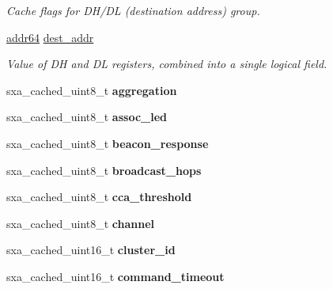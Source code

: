 \begin{DoxyCompactItemize}
\begin{DoxyCompactList}\small\item\em Cache flags for D\-H/\-D\-L (destination address) group. \end{DoxyCompactList}\item 
\hyperlink{unionaddr64}{addr64} \hyperlink{structsxa__node__t_abb357ccdd72453fd6f4ee76e18fde30c}{dest\-\_\-addr}
\begin{DoxyCompactList}\small\item\em Value of D\-H and D\-L registers, combined into a single logical field. \end{DoxyCompactList}\item 
\hypertarget{structsxa__node__t_addae4971fe88bef06542be6b2de54ea3}{sxa\-\_\-cached\-\_\-uint8\-\_\-t {\bfseries aggregation}}\label{structsxa__node__t_addae4971fe88bef06542be6b2de54ea3}

\item 
\hypertarget{structsxa__node__t_a4857814d272d7c236f20217036eadaa7}{sxa\-\_\-cached\-\_\-uint8\-\_\-t {\bfseries assoc\-\_\-led}}\label{structsxa__node__t_a4857814d272d7c236f20217036eadaa7}

\item 
\hypertarget{structsxa__node__t_afbbaf03169e6357fcc78463452c5f473}{sxa\-\_\-cached\-\_\-uint8\-\_\-t {\bfseries beacon\-\_\-response}}\label{structsxa__node__t_afbbaf03169e6357fcc78463452c5f473}

\item 
\hypertarget{structsxa__node__t_a2fe0610672454f943a5a01ade84e7180}{sxa\-\_\-cached\-\_\-uint8\-\_\-t {\bfseries broadcast\-\_\-hops}}\label{structsxa__node__t_a2fe0610672454f943a5a01ade84e7180}

\item 
\hypertarget{structsxa__node__t_a9b601d4ed7a3ec9b0e05528390e78cdd}{sxa\-\_\-cached\-\_\-uint8\-\_\-t {\bfseries cca\-\_\-threshold}}\label{structsxa__node__t_a9b601d4ed7a3ec9b0e05528390e78cdd}

\item 
\hypertarget{structsxa__node__t_a1f6b05bef57db1f1cbb4740a78914b5f}{sxa\-\_\-cached\-\_\-uint8\-\_\-t {\bfseries channel}}\label{structsxa__node__t_a1f6b05bef57db1f1cbb4740a78914b5f}

\item 
\hypertarget{structsxa__node__t_a112bc7028dd0dd7833eff63333fae9bb}{sxa\-\_\-cached\-\_\-uint16\-\_\-t {\bfseries cluster\-\_\-id}}\label{structsxa__node__t_a112bc7028dd0dd7833eff63333fae9bb}

\item 
\hypertarget{structsxa__node__t_a46cab60ad63ab8babe24c5ce86516638}{sxa\-\_\-cached\-\_\-uint16\-\_\-t {\bfseries command\-\_\-timeout}}\label{structsxa__node__t_a46cab60ad63ab8babe24c5ce86516638}


\end{DoxyCompactItemize}
